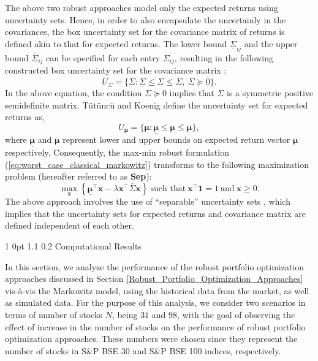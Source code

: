 \documentclass[12pt]{article}
\makeatletter
\numberwithin{equation}{section}
\renewcommand{\section}{
  \@startsection
  {section}%
  {1}%
  {0pt}%
  {1.1\baselineskip}%
  {0.2\baselineskip}%
  {\sc \centering}%
}
\makeatother
\begin{document}
The above two robust approaches model only the expected returns using uncertainty sets. Hence, in order to also encapsulate the uncertainly in the covariances, the box uncertainty set for the covariance matrix of returns is defined akin to that for expected returns. The lower bound $\underline{\Sigma}_{ij}$ and the upper bound $\overline{\Sigma}_{ij}$ can be specified for each entry $\Sigma_{ij}$, resulting in the following constructed box uncertainty set for the covariance matrix \cite{Tutuncu04}:
\begin{equation}
\label{eqn:separable_1}
U_{\Sigma}=\{\Sigma: \underline{\Sigma} \leq \Sigma \leq \overline{\Sigma},~\Sigma \succeq 0\}.
\end{equation}
In the above equation, the condition $\Sigma \succeq 0$ implies that $\Sigma$ is a symmetric positive semidefinite matrix. T{\"u}t{\"u}nc{\"u} and Koenig \cite{Tutuncu04} define the uncertainty set for expected returns as,
\begin{equation}
\label{eqn:separable_2}
U_{\boldsymbol{\mu}}=\{\boldsymbol{\mu}:\underline{\boldsymbol{\mu}}\leq\boldsymbol{\mu}\leq\overline{\boldsymbol{\mu}}\},
\end{equation}
where $\underline{\boldsymbol{\mu}}$ and $\overline{\boldsymbol{\mu}}$ represent lower and upper bounds on expected return vector $\boldsymbol{\mu}$ respectively. Consequently, the max-min robust formulation (\ref{eq:worst_case_classical_markowitz}) transforms to the following maximization problem (hereafter referred to as \textbf{Sep}):
\begin{equation}
\label{eqn:separable_markowitz}
\max_{\mathbf{x}} \left\{\underline{\boldsymbol{\mu}}^{\top}\mathbf{x}-\lambda \mathbf{x^{\top}}\overline{\Sigma}\mathbf{x}\right\}~\text{such that}~ \mathbf{x^{\top}}\mathbf{1}=1~\text{and}~\mathbf{x}\geq 0.
\end{equation}
The above approach involves the use of ``separable'' uncertainty sets \cite{Lu06}, which implies that the uncertainty sets for expected returns and covariance matrix are defined independent of each other.

\section{Computational Results}
\label{Computational_Results}

In this section, we analyze the performance of the robust portfolio optimization approaches discussed in Section \ref{Robust_Portfolio_Optimization_Approaches} vis-\`a-vis the Markowitz model, using the historical data from the market, as well as simulated data. For the purpose of this analysis, we consider two scenarios in terms of number of stocks $N$, being $31$ and $98$, with the goal of observing the effect of increase in the number of stocks on the performance of robust portfolio optimization approaches. These numbers were chosen since they represent the number of stocks in S\&P BSE 30 and S\&P BSE 100 indices, respectively.
\end{document}
